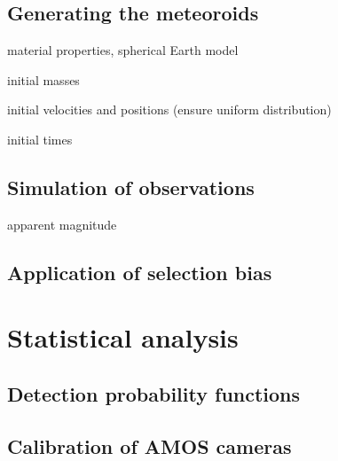     \subsection{Generating the meteoroids}
        material properties, spherical Earth model
        
        initial masses
        
        initial velocities and positions (ensure uniform distribution)
        
        initial times
        
    \subsection{Simulation of observations}
        apparent magnitude
        
    \subsection{Application of selection bias}
        
\section{Statistical analysis}
    \subsection{Detection probability functions}

    \subsection{Calibration of AMOS cameras}

    
    




    